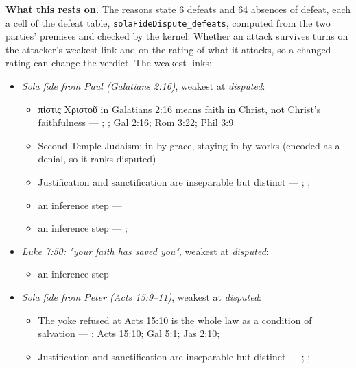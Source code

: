 \documentclass[11pt]{article}
\begin{document}
\par\noindent\textbf{What this rests on.} The reasons state 6 defeats and 64 absences of defeat, each a cell of the defeat table, \texttt{sola\allowbreak{}Fide\allowbreak{}Dispute\_\allowbreak{}defeats}, computed from the two parties' premises and checked by the kernel. Whether an attack survives turns on the attacker's weakest link and on the rating of what it attacks, so a changed rating can change the verdict. The weakest links:
\begin{itemize}
\item \emph{Sola fide from Paul (Galatians 2:16)}, weakest at \emph{disputed}:
\begin{itemize}
\item πίστις Χριστοῦ in Galatians 2:16 means faith in Christ, not Christ's faithfulness --- \cite{dunn-once-more-pistis-christou-1991}; \cite{matlock-detheologizing-2000}; Gal 2:16; Rom 3:22; Phil 3:9
\item Second Temple Judaism: in by grace, staying in by works (encoded as a denial, so it ranks disputed) --- \cite{sanders-paul-palestinian-judaism-1977}
\item Justification and sanctification are inseparable but distinct --- \cite[XIII.1]{westminster-confession-1647}; \cite[XI.1]{westminster-confession-1647}; \cite[III.xi.6]{calvin-institutes-1960}
\item an inference step --- \cite[Trent, Session VI (1547), canon 9]{tanner-decrees-1990}
\item an inference step --- \cite{gathercole-where-boasting-2002}; \cite{carson-variegated-nomism-1-2001}
\end{itemize}
\item \emph{Luke 7:50: "your faith has saved you"}, weakest at \emph{disputed}:
\begin{itemize}
\item an inference step --- \cite[Trent, Session VI (1547), canon 9]{tanner-decrees-1990}
\end{itemize}
\item \emph{Sola fide from Peter (Acts 15:9–11)}, weakest at \emph{disputed}:
\begin{itemize}
\item The yoke refused at Acts 15:10 is the whole law as a condition of salvation --- \cite[ad loc. Acts 15:10]{bruce-acts-1988}; Acts 15:10; Gal 5:1; Jas 2:10; \cite{das-paul-law-covenant-2001}
\item Justification and sanctification are inseparable but distinct --- \cite[XIII.1]{westminster-confession-1647}; \cite[XI.1]{westminster-confession-1647}; \cite[III.xi.6]{calvin-institutes-1960}

\end{itemize}
\end{itemize}
\end{document}
